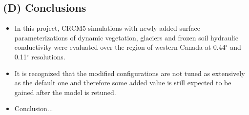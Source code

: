 \documentclass[a0b,landscape]{a0poster}
\begin{document}
\begin{multicols*}{4}
\begin{minipage}[t]{\linewidth}
\begin{tikzpicture}
\end{tikzpicture}
\end{minipage}



{
  \color{SaddleBrown} %

  \section*{(D) Conclusions}

  \begin{itemize}
  \item In this project, CRCM5 simulations with newly added surface parameterizations of dynamic vegetation,
  glaciers and frozen soil hydraulic conductivity were evaluated over the region of western Canada at 0.44$^\circ$ and 0.11$^\circ$ resolutions.
  \item It is recognized that the modified configurations are not tuned as extensively as the default one and therefore
  some added value is still expected to be gained after the model is retuned.
  \item Conclusion...
  \end{itemize}
}

\footnotesize
%

\end{multicols*}
\end{document}
